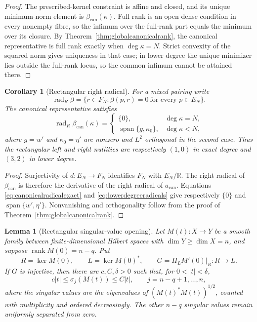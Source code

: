 \documentclass[11pt,a4paper]{article}
\newtheorem{corollary}[theorem]{Corollary}
\newtheorem{lemma}[theorem]{Lemma}
\theoremstyle{definition}
\theoremstyle{remark}
\newcommand{\R}{\mathbb{R}}
\newcommand{\Ker}{\operatorname{ker}}
\newcommand{\rank}{\operatorname{rank}}
\newcommand{\Rad}{\operatorname{rad}}
\newcommand{\spanof}{\operatorname{span}}
\begin{document}
\begin{proof}
The prescribed-kernel constraint is affine and closed, and its unique minimum-norm element
is $\beta_{\mathrm{can}}(\kappa)$.  Full rank is an open dense condition in every nonempty
fibre, so the infimum over the full-rank part equals the minimum over its closure.  By
Theorem~\ref{thm:globalcanonicalrank}, the canonical representative is full rank exactly
when $\deg\kappa=N$.  Strict convexity of the squared norm gives uniqueness in that case;
in lower degree the unique minimizer lies outside the full-rank locus, so the common
infimum cannot be attained there.
\end{proof}

\begin{corollary}[Rectangular right radical]\label{cor:rectangularradical}
For a mixed pairing write
\[
 \Rad_R\beta=\{r\in F_N:\beta(p,r)=0\ \text{for every }p\in E_N\}.
\]
The canonical representative satisfies
\begin{equation}\label{eq:rectangularradical}
 \boxed{
 \Rad_R\beta_{\mathrm{can}}(\kappa)=
 \begin{cases}
  \{0\},&\deg\kappa=N,\\
  \spanof\{g,\kappa_0\},&\deg\kappa<N,
 \end{cases}}
\end{equation}
where $g=w'$ and $\kappa_0=\eta'$ are nonzero and $L^2$-orthogonal in the second case.
Thus the rectangular left and right nullities are respectively $(1,0)$ in exact degree and
$(3,2)$ in lower degree.
\end{corollary}

\begin{proof}
Surjectivity of $d:E_N\to F_N$ identifies $F_N$ with $E_N/\R$.  The right radical of
$\beta_{\mathrm{can}}$ is therefore the derivative of the right radical of
$a_{\mathrm{can}}$.  Equations \eqref{eq:canonicalradicalexact} and
\eqref{eq:lowerdegreeradicals} give respectively $\{0\}$ and
$\spanof\{w',\eta'\}$.  Nonvanishing and orthogonality follow from the proof of
Theorem~\ref{thm:globalcanonicalrank}.
\end{proof}

\begin{lemma}[Rectangular singular-value opening]\label{lem:rectangularopening}
Let $M(t):X\to Y$ be a smooth family between finite-dimensional Hilbert spaces with
$\dim Y\geq\dim X=n$, and suppose $\rank M(0)=n-q$.  Put
\begin{equation}\label{eq:rectangularcrossing}
 R=\Ker M(0),\qquad L=\Ker M(0)^*,\qquad
 G=\Pi_LM'(0)|_R:R\longrightarrow L.
\end{equation}
If $G$ is injective, then there are $c,C,\delta>0$ such that, for $0<|t|<\delta$,
\begin{equation}\label{eq:rectangularsvbounds}
 c|t|\leq\sigma_j(M(t))\leq C|t|,
 \qquad j=n-q+1,\ldots,n,
\end{equation}
where the singular values are the eigenvalues of $(M(t)^*M(t))^{1/2}$, counted with
multiplicity and ordered decreasingly.  The other $n-q$ singular values remain uniformly
separated from zero.
\end{lemma}
\end{document}

